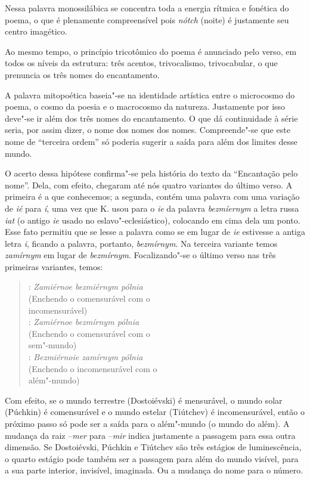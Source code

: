 Nessa palavra monossilábica se concentra toda a energia rítmica e
fonética do poema, o que é plenamente compreensível pois \emph{nótch}
(noite) é justamente seu centro imagético.

Ao mesmo tempo, o princípio tricotômico do poema é anunciado pelo 
verso, em todos os níveis da estrutura: três acentos, trivocalismo,
trivocabular, o que prenuncia os três nomes do encantamento.

A palavra mitopoética baseia"-se na identidade artística entre o
microcosmo do poema, o cosmo da poesia e o macrocosmo da natureza.
Justamente por isso deve"-se ir além dos três nomes do encantamento. O
que dá continuidade à série seria, por assim dizer, o nome dos nomes dos
nomes. Compreende"-se que este nome de ``terceira ordem'' só poderia
sugerir a saída para além dos limites desse mundo.

O acerto dessa hipótese confirma"-se pela história do texto da
``Encantação pelo nome''. Dela, com efeito, chegaram até nós quatro
variantes do último verso. A primeira é a que conhecemos; a segunda,
contém uma palavra com uma variação de \emph{ié} para \emph{í}, uma vez
que K. usou para o \emph{ie} da palavra \emph{bezm\emph{íe}rnym} a letra
russa \emph{iat} (o antigo \emph{ie} usado no eslavo"-eclesiástico),
colocando em cima dela um ponto. Esse fato permitiu que se lesse a
palavra como se em lugar de \emph{ie} estivesse a antiga letra
\emph{i}, ficando a palavra, portanto, \emph{bezmírnym}. Na terceira
variante temos \emph{zamírnym} em lugar de \emph{bezmírnym}.
Focalizando"-se o último verso nas três primeiras variantes, temos:

\begin{verse}
: \emph{Zamiérnoe bezmiérnym pólnia} \\
(Enchendo o comensurável com o \\
incomensurável) \\[8pt]

: \emph{Zamiérnoe bezmírnym pólnia} \\
(Enchendo o comensurável com o \\
sem"-mundo) \\[8pt]

: \emph{Bezmiérnoie zamírnym pólnia} \\
(Enchendo o incomensurável com o \\
além"-mundo)
\end{verse}

Com efeito, se o mundo terrestre (Dostoiévski) é mensurável, o mundo
solar (Púchkin) é comensurável e o mundo estelar (Tiútchev) é
incomensurável, então o próximo passo só pode ser a saída para o
além"-mundo (o mundo do além). A mudança da raiz --\emph{mer} para
--\emph{mir} indica justamente a passagem para essa outra dimensão. Se
Dostoiévski, Púchkin e Tiútchev são três estágios de luminescência, o
quarto estágio pode também ser a passagem para além do mundo visível,
para a sua parte interior, invisível, imaginada. Ou a mudança do nome
para o número.

